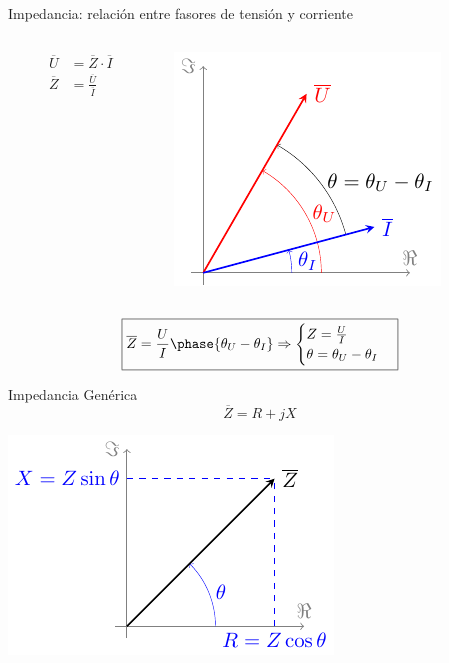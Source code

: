 \documentclass[aspectratio=169, usenames,svgnames,dvipsnames]{beamer}
\begin{document}
\begin{frame}[label={sec:org462806b}]{Impedancia: relación entre fasores de tensión y corriente}
\begin{columns}
\begin{column}{0.5\columnwidth}
\begin{align*}
  \overline{U} &= \overline{Z} \cdot \overline{I}\\                 
  \overline{Z} &= \frac{\overline{U}}{\overline{I}}
\end{align*}
\end{column}

\begin{column}{0.5\columnwidth}
\begin{center}
\includegraphics[height=0.5\textheight]{../figs/fasorTensionCorriente.pdf}
\end{center}
\end{column}
\end{columns}

\[
\boxed{\overline{Z} = \frac{U}{I}\phase{\theta_U - \theta_I} \Rightarrow 
    \begin{cases}
      Z = \frac{U}{I}\\
      \theta = \theta_U - \theta_I
    \end{cases}}
\]
\end{frame}



\begin{frame}[label={sec:orgb090602}]{Impedancia Genérica}
\[
\overline{Z} = R + j X
\]

\begin{center}
\includegraphics[height=0.75\textheight]{../figs/fasorImpedancia.pdf}
\end{center}
\end{frame}
\end{document}
